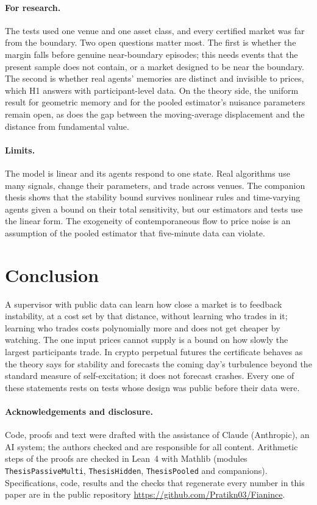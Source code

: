 \documentclass[12pt]{article}
\theoremstyle{definition}
\theoremstyle{remark}
\begin{document}
\paragraph{For research.} The tests used one venue and one asset class, and every certified market was far from the boundary. Two open questions matter most. The first is whether the margin falls before genuine near-boundary episodes; this needs events that the present sample does not contain, or a market designed to be near the boundary. The second is whether real agents' memories are distinct and invisible to prices, which H1 answers with participant-level data. On the theory side, the uniform result for geometric memory and for the pooled estimator's nuisance parameters remain open, as does the gap between the moving-average displacement and the distance from fundamental value.

\paragraph{Limits.} The model is linear and its agents respond to one state. Real algorithms use many signals, change their parameters, and trade across venues. The companion thesis shows that the stability bound survives nonlinear rules and time-varying agents given a bound on their total sensitivity, but our estimators and tests use the linear form. The exogeneity of contemporaneous flow to price noise is an assumption of the pooled estimator that five-minute data can violate.

\section{Conclusion}

A supervisor with public data can learn how close a market is to feedback instability, at a cost set by that distance, without learning who trades in it; learning who trades costs polynomially more and does not get cheaper by watching. The one input prices cannot supply is a bound on how slowly the largest participants trade. In crypto perpetual futures the certificate behaves as the theory says for stability and forecasts the coming day's turbulence beyond the standard measure of self-excitation; it does not forecast crashes. Every one of these statements rests on tests whose design was public before their data were.

\paragraph{Acknowledgements and disclosure.} Code, proofs and text were drafted with the assistance of Claude (Anthropic), an AI system; the authors checked and are responsible for all content. Arithmetic steps of the proofs are checked in Lean~4 with Mathlib (modules \texttt{ThesisPassiveMulti}, \texttt{ThesisHidden}, \texttt{ThesisPooled} and companions). Specifications, code, results and the checks that regenerate every number in this paper are in the public repository \url{https://github.com/Pratikn03/Fianince}.
\end{document}
